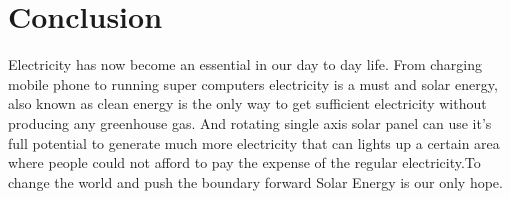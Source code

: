\section*{Conclusion}
Electricity has now become an essential in our day to day life. From charging mobile phone to running super computers electricity is a must and solar energy, also known as clean energy is the only way to get sufficient electricity without producing any greenhouse gas. And rotating single axis solar panel can use it's full potential to generate much more electricity that can lights up a certain area where people could not afford to pay the expense of the regular electricity.To change the world and push the boundary forward Solar Energy is our only hope.